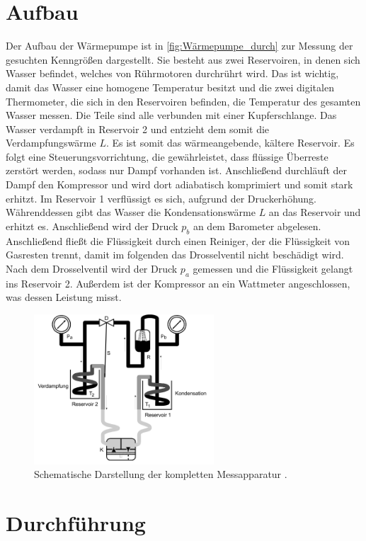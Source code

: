 \section{Aufbau}
\label{sec:Aufbau}
Der Aufbau der Wärmepumpe ist in \autoref{fig:Wärmepumpe_durch} zur Messung der gesuchten Kenngrößen dargestellt.
Sie besteht aus zwei Reservoiren, in denen sich Wasser befindet, welches von Rührmotoren durchrührt wird. 
Das ist wichtig, damit das Wasser eine homogene Temperatur besitzt und die zwei digitalen Thermometer, die sich in den Reservoiren befinden, die Temperatur des gesamten Wasser messen.
Die Teile sind alle verbunden mit einer Kupferschlange.
Das Wasser verdampft in Reservoir 2 und entzieht dem somit die Verdampfungswärme $L$.
Es ist somit das wärmeangebende, kältere Reservoir.
Es folgt eine Steuerungsvorrichtung, die gewährleistet, dass flüssige Überreste zerstört werden, sodass nur Dampf vorhanden ist.
Anschließend durchläuft der Dampf den Kompressor und wird dort adiabatisch komprimiert und somit stark erhitzt.
Im Reservoir 1 verflüssigt es sich, aufgrund der Druckerhöhung.
Währenddessen gibt das Wasser die Kondensationswärme $L$ an das Reservoir und erhitzt es.
Anschließend wird der Druck $p_b$ an dem Barometer abgelesen. 
Anschließend fließt die Flüssigkeit durch einen Reiniger, der die Flüssigkeit von Gasresten trennt, damit im folgenden das Drosselventil nicht beschädigt wird.
Nach dem Drosselventil wird der Druck $p_a$ gemessen und die Flüssigkeit gelangt ins Reservoir 2.
Außerdem ist der Kompressor an  ein Wattmeter angeschlossen, was dessen Leistung misst.
\begin{figure}[H]
    \centering
    \includegraphics[width=0.6\textwidth]{build/Abb1.png}
    \caption{Schematische Darstellung der kompletten Messapparatur \cite[197]{V206}.}
    \label{fig:Wärmepumpe_durch}
\end{figure}
\section{Durchführung}
\label{sec:Durchführung}
